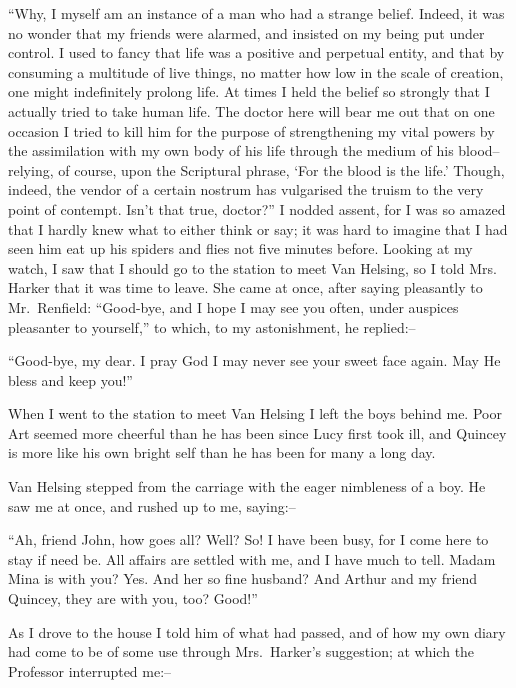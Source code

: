 \documentclass[12pt,openright]{book}
\begin{document}
“Why, I myself am an instance of a man who had a strange belief. Indeed, it was no wonder that my friends were alarmed, and insisted on my being put under control. I used to fancy that life was a positive and perpetual entity, and that by consuming a multitude of live things, no matter how low in the scale of creation, one might indefinitely prolong life. At times I held the belief so strongly that I actually tried to take human life. The doctor here will bear me out that on one occasion I tried to kill him for the purpose of strengthening my vital powers by the assimilation with my own body of his life through the medium of his blood–relying, of course, upon the Scriptural phrase, ‘For the blood is the life.’ Though, indeed, the vendor of a certain nostrum has vulgarised the truism to the very point of contempt. Isn’t that true, doctor?” I nodded assent, for I was so amazed that I hardly knew what to either think or say; it was hard to imagine that I had seen him eat up his spiders and flies not five minutes before. Looking at my watch, I saw that I should go to the station to meet Van Helsing, so I told Mrs. Harker that it was time to leave. She came at once, after saying pleasantly to Mr. Renfield: “Good-bye, and I hope I may see you often, under auspices pleasanter to yourself,” to which, to my astonishment, he replied:–

“Good-bye, my dear. I pray God I may never see your sweet face again. May He bless and keep you!”

When I went to the station to meet Van Helsing I left the boys behind me. Poor Art seemed more cheerful than he has been since Lucy first took ill, and Quincey is more like his own bright self than he has been for many a long day.

Van Helsing stepped from the carriage with the eager nimbleness of a boy. He saw me at once, and rushed up to me, saying:–

“Ah, friend John, how goes all? Well? So! I have been busy, for I come here to stay if need be. All affairs are settled with me, and I have much to tell. Madam Mina is with you? Yes. And her so fine husband? And Arthur and my friend Quincey, they are with you, too? Good!”

As I drove to the house I told him of what had passed, and of how my own diary had come to be of some use through Mrs. Harker’s suggestion; at which the Professor interrupted me:–
\end{document}
